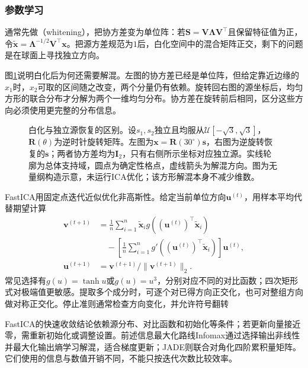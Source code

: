 \subsubsection{参数学习}
\label{sec:dim-ica-learning}

通常先做（whitening），把协方差变为单位阵：若$\bm{S}=\bm{V}\bm{\Lambda}\bm{V}^{\top}$且保留特征值为正，令$\widetilde{\bm{x}}=\bm{\Lambda}^{-1/2}\bm{V}^{\top}\bm{x}$。把源方差规范为$1$后，白化空间中的混合矩阵正交，剩下的问题是在球面上寻找独立方向。

图\ref{fig:dim-ica-whitening}说明白化后为何还需要解混。左图的协方差已经是单位阵，但给定靠近边缘的$x_1$时，$x_2$可取的区间随之改变，两个分量仍有依赖。旋转回右图的源坐标后，均匀方形的联合分布才分解为两个一维均匀分布。协方差在旋转前后相同，区分这些方向必须使用更完整的分布信息。

\begin{figure}[!ht]
  \centering
  
  \caption{白化与独立源恢复的区别。设$s_1,s_2$独立且均服从$\mathcal{U}[-\sqrt3,\sqrt3]$，$\bm{R}(\theta)$为逆时针旋转矩阵。左图为$\bm{x}=\bm{R}(30^\circ)\bm{s}$，右图为逆旋转恢复的$\bm{s}$；两者协方差均为$\bm{I}_2$，只有右侧所示坐标对应独立源。实线轮廓为总体支持域，圆点为确定性格点，虚线箭头为解混方向。图为无量纲构造示意，未运行ICA优化；该方形解混本身不减少维数。}
  \label{fig:dim-ica-whitening}
\end{figure}

FastICA用固定点迭代近似优化非高斯性。给定当前单位方向$\bm{u}^{(t)}$，用样本平均代替期望计算
\begin{equation}
  \begin{aligned}
  \bm{v}^{(t+1)}
    &=\frac1n\sum_{i=1}^{n}
      \widetilde{\bm{x}}_i
           g((\bm{u}^{(t)})^{\top}\widetilde{\bm{x}}_i)\\
    &\quad-\left[\frac1n\sum_{i=1}^{n}
      g'((\bm{u}^{(t)})^{\top}\widetilde{\bm{x}}_i)\right]\bm{u}^{(t)},\\
  \bm{u}^{(t+1)}
    &=\bm{v}^{(t+1)}/\lVert\bm{v}^{(t+1)}\rVert_2.
  \end{aligned}
  \label{eq:dim-fastica}
\end{equation}
常见选择有$g(u)=\tanh u$或$g(u)=u^3$，分别对应不同的对比函数；四次矩形式对极端值更敏感。提取多个成分时，可逐个对已得方向正交化，也可对整组方向做对称正交化。停止准则通常检查方向变化，并允许符号翻转

FastICA的快速收敛结论依赖源分布、对比函数和初始化等条件；若更新向量接近零，需重新初始化或调整设置。前述信息最大化路线Infomax通过选择输出非线性并最大化输出熵学习解混，适合梯度更新；JADE则联合对角化四阶累积量矩阵。它们使用的信息与数值开销不同，不能只按迭代次数比较效率。


